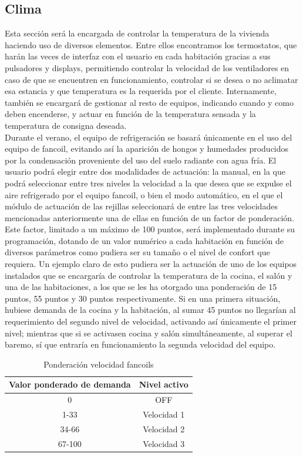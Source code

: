 \subsection{Clima} \label{sec:sec_clima} Esta sección será la encargada de controlar la temperatura de la vivienda haciendo uso de diversos elementos. Entre ellos encontramos los termostatos, que harán las veces de interfaz con el usuario en cada habitación gracias a sus pulsadores y displays, permitiendo controlar la velocidad de los ventiladores en caso de que se encuentren en funcionamiento, controlar si se desea o no aclimatar esa estancia y que temperatura es la requerida por el cliente. Internamente, también se encargará de gestionar al resto de equipos, indicando cuando y como deben encenderse, y actuar en función de la temperatura sensada y la temperatura de consigna deseada. \\
Durante el verano, el equipo de refrigeración se basará únicamente en el uso del equipo de fancoil, evitando así la aparición de hongos y humedades producidos por la condensación proveniente del uso del suelo radiante con agua fría. El usuario podrá elegir entre dos modalidades de actuación: la manual, en la que podrá seleccionar entre tres niveles la velocidad a la que desea que se expulse el aire refrigerado por el equipo fancoil, o bien el modo automático, en el que el módulo de actuación de las rejillas seleccionará de entre las tres velocidades mencionadas anteriormente una de ellas en función de un factor de ponderación. Este factor, limitado a un máximo de 100 puntos, será implementado durante su programación, dotando de un valor numérico a cada habitación en función de diversos parámetros como pudiera ser su tamaño o el nivel de confort que requiera. Un ejemplo claro de esto pudiera ser la actuación de uno de los equipos instalados que se encargaría de controlar la temperatura de la cocina, el salón y una de las habitaciones, a los que se les ha otorgado una ponderación de 15 puntos, 55 puntos y 30 puntos respectivamente. Si en una primera situación, hubiese demanda de la cocina y la habitación, al sumar 45 puntos no llegarían al requerimiento del segundo nivel de velocidad, activando así únicamente el primer nivel; mientras que si se activasen cocina y salón simultáneamente, al superar el baremo, sí que entraría en funcionamiento la segunda velocidad del equipo.
\bigskip
\begin{table}[H]
\begin{center}
\begin{tabular}{| c | c |} \hline
\rule[0mm]{0mm}{6mm}
\textbf{Valor ponderado de demanda} & \textbf{Nivel activo} \\ \hline
\rule[0mm]{0mm}{4mm}
0 & OFF \\ \hline
\rule[0mm]{0mm}{4mm}
1-33 & Velocidad 1 \\ \hline
\rule[0mm]{0mm}{4mm}
34-66 & Velocidad 2 \\ \hline
\rule[0mm]{0mm}{4mm}
67-100 & Velocidad 3 \\ \hline
\end{tabular}
\caption{Ponderación velocidad fancoils}
\label{tab:vel_fancoils}
\end{center}
\end{table}

